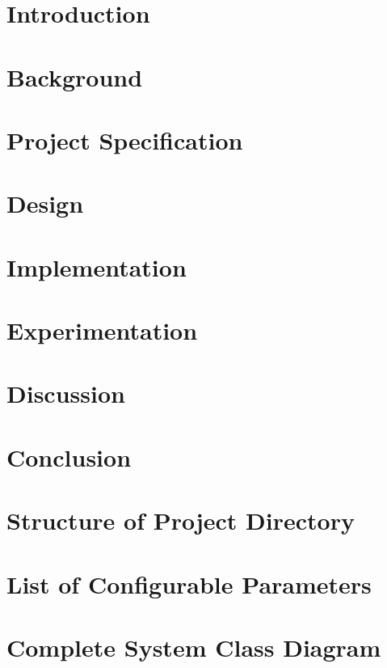 \documentclass[12pt,a4paper]{report}
\begin{document}


\onehalfspacing


\tableofcontents
\listoffigures
\listofalgorithms

\chapter{Introduction}
\label{ch:introduction}


\chapter{Background}
\label{ch:background}


\chapter{Project Specification}
\label{ch:project_spec}


\chapter{Design}
\label{ch:design}


\chapter{Implementation}
\label{ch:implementation}


\chapter{Experimentation}
\label{ch:experimentation}


\chapter{Discussion}
\label{ch:discussion}


\chapter{Conclusion}
\label{ch:conclusion}


\printbibliography

\appendix
\chapter{Structure of Project Directory}
\label{appendix:directory}


\chapter{List of Configurable Parameters}
\label{appendix:parameters}


\chapter{Complete System Class Diagram}
\label{appendix:class_diagram}

\end{document}
